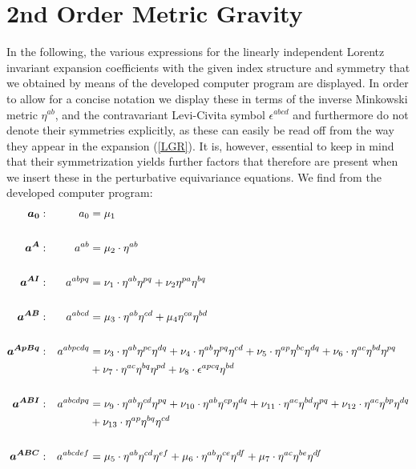 \documentclass[a4paper,12pt, DIV=14, BCOR=5mm, twoside, headsepline, numbers=noenddot]{scrbook}
\begin{document}
\section{2nd Order Metric Gravity}\label{AppGR}
In the following, the various expressions for the linearly independent Lorentz invariant expansion coefficients with the given index structure and symmetry that we obtained by means of the developed computer program are displayed. In order to allow for a concise notation we display these in terms of the inverse Minkowski metric $\eta^{ab}$, and the contravariant Levi-Civita symbol $\epsilon^{abcd}$ and furthermore do not denote their symmetries explicitly, as these can easily be read off from the way they appear in the expansion (\ref{LGR}). It is, however, essential to keep in mind that their symmetrization yields further factors that therefore are present when we insert these in the perturbative equivariance equations. We find from the developed computer program:
\begin{align}\label{LorentzGR1}
\begin{alignedat}{2}
\boldsymbol{a_0}&: \ \ \ & a_0  &= \mu_1 \\
\\
\boldsymbol{a^{A}}&: \ \ \ & a^{ab}  &= \mu_2 \cdot \eta^{ab} \\
\\
\boldsymbol{a^{AI}}&: \ \ \ & a^{abpq}  &=  \nu_1 \cdot \eta^{ab}\eta^{pq} + \nu_2 \eta^{pa} \eta^{bq} \\
\\
\boldsymbol{a^{AB}}&: \ \ \ & a^{abcd}  &=  \mu_3 \cdot \eta^{ab}\eta^{cd} + \mu_4 \eta^{ca} \eta^{bd}\\
\\
\boldsymbol{a^{ApBq}}&: \ \ \ & a^{abpcdq}  &= \nu_3 \cdot \eta^{ab}\eta^{pc}\eta^{dq}+\nu_4 \cdot \eta^{ab}\eta^{pq}\eta^{cd}+\nu_5 \cdot \eta^{ap}\eta^{bc}\eta^{dq}+\nu_6 \cdot \eta^{ac}\eta^{bd}\eta^{pq} \\ &  &\hphantom{=} & 
+\nu_7 \cdot \eta^{ac}\eta^{bq}\eta^{pd} +\nu_8 \cdot \epsilon^{apcq}\eta^{bd} \\
\\
\boldsymbol{a^{ABI}}&: \ \ \ & a^{abcdpq}  &= \nu_9 \cdot \eta^{ab}\eta^{cd}\eta^{pq}+\nu_{10} \cdot \eta^{ab}\eta^{cp}\eta^{dq}+\nu_{11} \cdot \eta^{ac}\eta^{bd}\eta^{pq}+\nu_{12} \cdot \eta^{ac}\eta^{bp}\eta^{dq}\\
&  &\hphantom{=} & +\nu_{13} \cdot \eta^{ap}\eta^{bq}\eta^{cd}\\
\\
\boldsymbol{a^{ABC}}&: \ \ \ & a^{abcdef}  &= \mu_5\cdot \eta^{ab}\eta^{cd}\eta^{ef}+\mu_6\cdot \eta^{ab}\eta^{ce}\eta^{df}+\mu_7\cdot \eta^{ac}\eta^{be}\eta^{df}\\
\end{alignedat}
\end{align}
\end{document}
